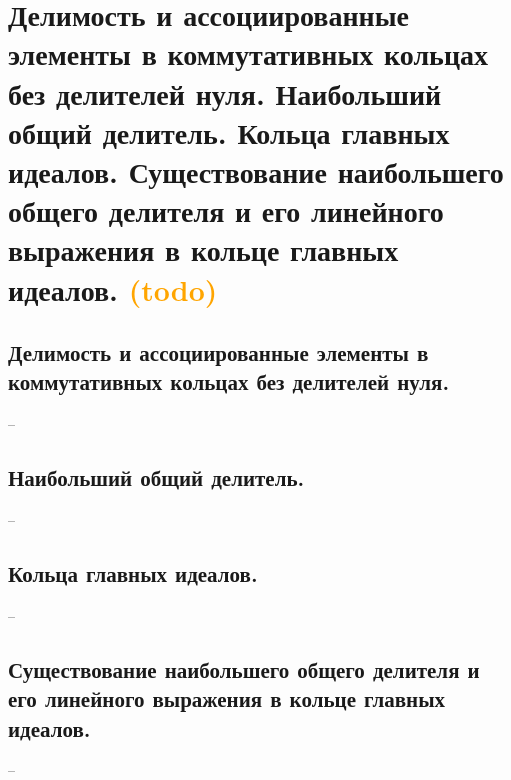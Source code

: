 \section{Делимость и ассоциированные элементы в коммутативных кольцах без делителей нуля. Наибольший общий делитель. Кольца главных идеалов. Существование наибольшего общего делителя и его линейного выражения в кольце главных идеалов. \textcolor{orange}{(todo)}}

\subsection{Делимость и ассоциированные элементы в коммутативных кольцах без делителей нуля.}
--

\subsection{Наибольший общий делитель.}
--

\subsection{Кольца главных идеалов.}
--

\subsection{Существование наибольшего общего делителя и его линейного выражения в кольце главных идеалов.}
--